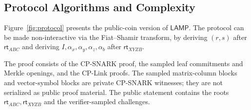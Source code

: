 \documentclass[conference,compsoc]{IEEEtran}
\newcommand{\rt}{\textsf{rt}}
\renewcommand{\enc}{\mathsf{Enc}}   %
\newcommand{\protocol}{\textsf{LAMP}}   %
\theoremstyle{plain}
\theoremstyle{definition}
\theoremstyle{remark}
\providecommand{\DIFaddtex}[1]{{\protect\color{DIFADD} \sf #1}} %
\providecommand{\DIFaddbegin}{} %
\providecommand{\DIFaddend}{} %
\providecommand{\DIFadd}[1]{\texorpdfstring{\DIFaddtex{#1}}{#1}} %
\providecommand{\DIFaddincludegraphics}[2][]{{\color{blue}\fbox{\DIFOincludegraphics[#1]{#2}}}} %
\DeclareRobustCommand{\DIFaddbegin}{\DIFOaddbegin \let\includegraphics\DIFaddincludegraphics} %
\DeclareRobustCommand{\DIFaddend}{\DIFOaddend \let\includegraphics\DIFOincludegraphics} %
\begin{document}




\subsection{Protocol Algorithms and Complexity}
\label{sec:protocol-complexity}
Figure~\ref{fig:protocol} presents the public-coin version of
\(\protocol\).  The protocol can be made non-interactive via the
Fiat--Shamir transform, by deriving  \DIFaddbegin \DIFadd{\((r,s)\) }\DIFaddend after \(\rt_{ABC}\) and deriving
 \DIFaddbegin \DIFadd{\(I,\alpha_x,\alpha_y,\alpha_z,\alpha_b\) after \(\rt_{XYZB}\)}\DIFaddend .

The proof consists of the CP-SNARK proof, the sampled leaf commitments and
Merkle openings, and the CP-Link proofs.  The sampled matrix-column blocks and
vector-symbol blocks are private CP-SNARK witnesses; they are not serialized as
public proof material.
The public statement contains the roots
 \DIFaddbegin \DIFadd{\(\rt_{ABC},\rt_{XYZB}\) }\DIFaddend and the verifier-sampled challenges. \\
\end{document}
